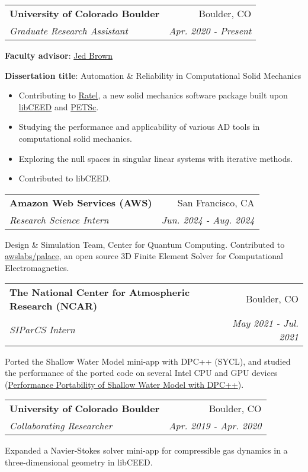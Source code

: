 \documentclass[letterpaper,11pt]{article}
\makeatletter
\newcommand{\resumeSubheading}[4]{
  \vspace{-1pt}\item
    \begin{tabular*}{0.97\textwidth}{l@{\extracolsep{\fill}}r}
      \textbf{#1} & #2 \\
      \textit{\small#3} & \textit{\small #4} \\
    \end{tabular*}\vspace{-5pt}
}
\makeatother
\begin{document}
    \resumeSubheading
      {University of Colorado Boulder}{Boulder, CO}
      {Graduate Research Assistant}{Apr. 2020 - Present}
      \vspace{.1 mm}

      \textbf{Faculty advisor}: \href{https://jedbrown.org/}{Jed Brown}
      
      \textbf{Dissertation title}: Automation \& Reliability in Computational Solid Mechanics
      \begin{itemize}
        \item Contributing to \href{https://gitlab.com/micromorph/ratel}{Ratel}, a new solid mechanics software package built upon \href{https://github.com/CEED/libCEED}{libCEED} and \href{https://www.mcs.anl.gov/petsc/}{PETSc}.
        \item Studying the performance and applicability of various AD tools in computational solid mechanics.
        \item Exploring the null spaces in singular linear systems with iterative methods.
        \item Contributed to libCEED.
      \end{itemize}

    \resumeSubheading
      {Amazon Web Services (AWS)}{San Francisco, CA}
      {Research Science Intern}{Jun. 2024 - Aug. 2024}
      \vspace{.1 mm}
      
       Design \& Simulation Team, Center for Quantum Computing. Contributed to \href{https://github.com/awslabs/palace}{awslabs/palace}, an open source 3D Finite Element Solver for Computational Electromagnetics.
       
    \resumeSubheading
      {The National Center for Atmospheric Research (NCAR)}{Boulder, CO}
      {SIParCS Intern}{May 2021 - Jul. 2021}
      \vspace{.1 mm}
      
       Ported the Shallow Water Model mini-app with DPC++ (SYCL), and studied the performance of the ported code on several Intel CPU and GPU devices (\href{https://www2.cisl.ucar.edu/siparcs-2021-ghaffari}{Performance Portability of Shallow Water Model with DPC++}).
      
    \resumeSubheading
      {University of Colorado Boulder}{Boulder, CO}
      {Collaborating Researcher}{Apr. 2019 - Apr. 2020}
      \vspace{.1 mm}
      
      Expanded a Navier-Stokes solver mini-app for compressible gas dynamics in a three-dimensional geometry in libCEED.
      
\end{document}
